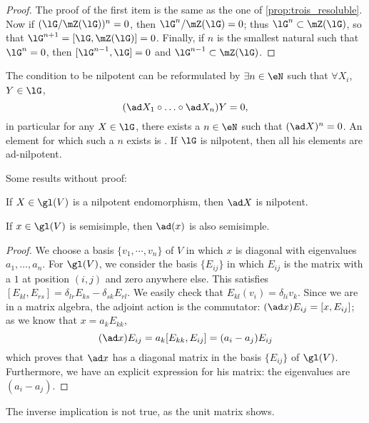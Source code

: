 \begin{proof}
The proof of the first item is the same as the one of \ref{prop:trois_resoluble}. Now if $(\lG/\mZ(\lG))^n=0$, then $\lG^n/\mZ(\lG)=0$; thus $\lG^n\subset\mZ(\lG)$, so that $\lG^{n+1}=[\lG,\mZ(\lG)]=0$. Finally, if $n$ is the smallest natural such that $\lG^n=0$, then $[\lG^{n-1},\lG]=0$ and $\lG^{n-1}\subset\mZ(\lG)$.
\end{proof}

The condition to be nilpotent can be reformulated by $\exists n\in\eN$ such that $\forall X_i$, $Y\in\lG$,
\[
   (\ad X_1\circ\ldots\circ\ad X_n)Y=0,
\]
in particular for any $X\in\lG$, there exists a $n\in\eN$ such that $(\ad X)^n=0$. An element for which such a $n$ exists is . If $\lG$ is nilpotent, then all his elements are ad-nilpotent.

Some results without proof:

\begin{lemma}\label{lem:pre_Engel}
If $X\in\gl(V)$ is a nilpotent endomorphism, then $\ad X$ is nilpotent.
\end{lemma}

\begin{lemma}
If $x\in\gl(V)$ is semisimple, then $\ad(x)$ is also semisimple.
\end{lemma}

\begin{proof}
We choose a basis $\{v_1,\cdots,v_n\}$ of $V$ in which $x$ is diagonal with eigenvalues $a_1,\ldots,a_n$. For $\gl(V)$, we consider the basis $\{E_{ij}\}$ in which $E_{ij}$ is the matrix with a $1$ at position $(i,j)$ and zero anywhere else. This satisfies $[E_{kl},E_{rs}]=\delta_{lr}E_{ks}-\delta_{sk}E_{rl}$. We easily check that $E_{kl}(v_i)=\delta_{li}v_k$. Since we are in a matrix algebra, the adjoint action is the commutator: $(\ad x)E_{ij}=[x,E_{ij}]$; as we know that $x=a_kE_{kk}$, 
\begin{equation}
 (\ad x)E_{ij}=a_k[E_{kk},E_{ij}]=(a_i-a_j)E_{ij}
\end{equation}
which proves that $\ad x$ has a diagonal matrix in the basis $\{E_{ij}\}$ of $\gl(V)$. Furthermore, we have an explicit expression for his matrix: the eigenvalues are $(a_i-a_j)$.
\end{proof}

\begin{remark}
The inverse implication is not true, as the unit matrix shows.
\end{remark}

